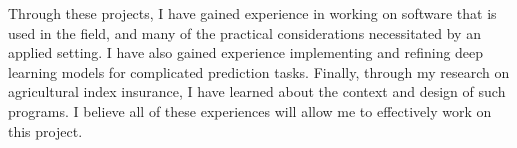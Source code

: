 \documentclass[12pt]{article}
\begin{document}

Through these projects, I have gained experience in working on software that is used in the field, and many of the practical considerations  necessitated by an applied setting. I have also gained experience implementing and refining deep learning models for complicated prediction tasks. Finally, through my research on agricultural index insurance, I have learned about the context and design of such programs. I believe all of these experiences will allow me to effectively work on this project. 
 
\end{document}
